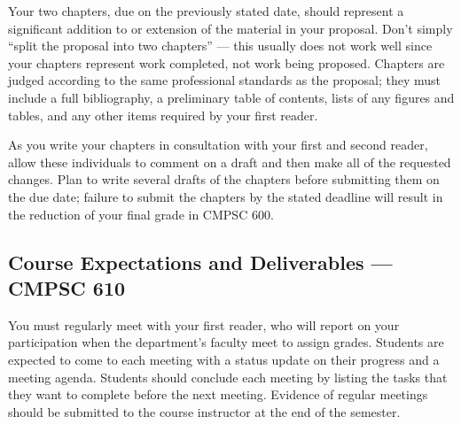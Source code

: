 % 
% 

\medskip
{} Your two chapters, due on the previously stated date, should represent a
significant addition to or extension of the material in your proposal. Don't simply ``split the proposal into two
chapters'' --- this usually does not work well since your chapters represent work completed, not work being proposed.
Chapters are judged according to the same professional standards as the proposal; they must include a full bibliography, a 
preliminary table of contents, lists of any figures and tables, and any other items required by your first reader.

As you write your chapters in consultation with your first and second reader, allow these individuals to comment on a
draft and then make all of the requested changes.  Plan to write several drafts of the chapters before submitting them
on the due date; failure to submit the chapters by the stated deadline will result in the reduction of your final grade
in CMPSC 600.

\subsection*{Course Expectations and Deliverables --- CMPSC 610}


\medskip
{} You must regularly meet with your first reader, who will report on your participation when
the department's faculty meet to assign grades.  Students are expected to come to each meeting with a status update on
their progress and a meeting agenda.  Students should conclude each meeting by listing the tasks that they want to
complete before the next meeting. Evidence of regular meetings should be submitted to the course instructor at the end
of the semester. 

% 



